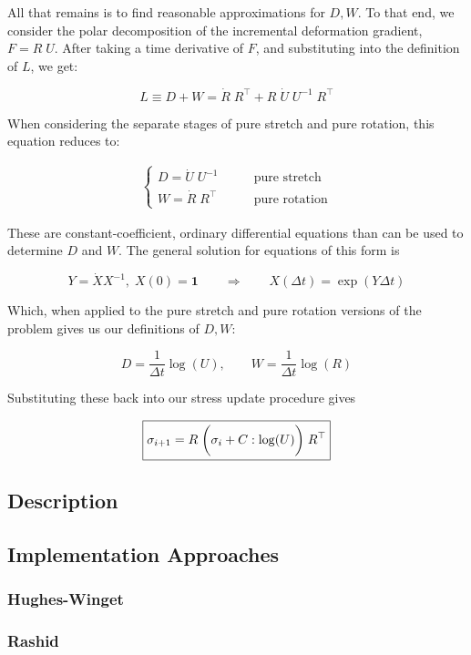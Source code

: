 All that remains is to find reasonable approximations for $D, W$. To that end, we
consider the polar decomposition of the incremental deformation gradient, 
$F = R \; U$. After taking a time derivative of $F$, and substituting into the
definition of $L$, we get:

$$ L \equiv D + W = \dot{R} \; R^\top + R \; \dot{U} \; U^{-1} \; R^\top $$

When considering the separate stages of pure stretch and pure rotation, this
equation reduces to:

\begin{align*}
\begin{cases}
D = \dot{U} \; U^{-1} & \qquad \text{pure stretch} \\
W = \dot{R} \; R^\top & \qquad \text{pure rotation}
\end{cases}
\end{align*}

These are constant-coefficient, ordinary differential equations
than can be used to determine $D$ and $W$. The
general solution for equations of this form is

$$ 
Y = \dot{X} X^{-1}, \; X(0) = \mathbf{1} 
\qquad 
\Longrightarrow 
\qquad 
X(\Delta t) = \exp(Y \Delta t)
$$

Which, when applied to the pure stretch and pure rotation versions of the problem
gives us our definitions of $D, W$:

$$ D = \frac{1}{\Delta t} \log(U), \qquad W = \frac{1}{\Delta t} \log(R) $$

Substituting these back into our stress update procedure gives 

$$\boxed{\sigma_{i+1} = R \; \displaystyle \bigg( \sigma_i + C : \log(U) \bigg) \; R^\top}$$




\subsection{Description}
\label{Description}

\subsection{Implementation Approaches}
\label{Implementation Approaches}
\subsubsection{Hughes-Winget}
\label{Hughes-Winget}

\subsubsection{Rashid}
\label{Rashid}